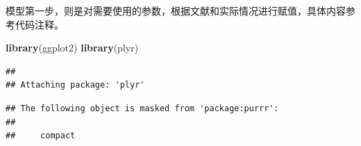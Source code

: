 \documentclass[
]{krantz}
\makeatletter
\newenvironment{Shaded}{\begin{snugshade}}{\end{snugshade}}
\newcommand{\KeywordTok}[1]{\textcolor[rgb]{0.13,0.29,0.53}{\textbf{#1}}}
\newcommand{\NormalTok}[1]{#1}
\newenvironment{kframe}{%
\medskip{}
\setlength{\fboxsep}{.8em}
 \def\at@end@of@kframe{}%
 \ifinner\ifhmode%
  \def\at@end@of@kframe{\end{minipage}}%
  \begin{minipage}{\columnwidth}%
 \fi\fi%
 \def\FrameCommand##1{\hskip\@totalleftmargin \hskip-\fboxsep
 \colorbox{shadecolor}{##1}\hskip-\fboxsep
     \hskip-\linewidth \hskip-\@totalleftmargin \hskip\columnwidth}%
 \MakeFramed {\advance\hsize-\width
   \@totalleftmargin\z@ \linewidth\hsize
   \@setminipage}}%
 {\par\unskip\endMakeFramed%
 \at@end@of@kframe}
\renewenvironment{Shaded}{\begin{kframe}}{\end{kframe}}
\makeatother
\begin{document}
模型第一步，则是对需要使用的参数，根据文献和实际情况进行赋值，具体内容参考代码注释。

\begin{Shaded}
\begin{Highlighting}[]
\KeywordTok{library}\NormalTok{(ggplot2)}
\KeywordTok{library}\NormalTok{(plyr)}
\end{Highlighting}
\end{Shaded}

\begin{verbatim}
## 
## Attaching package: 'plyr'
\end{verbatim}

\begin{verbatim}
## The following object is masked from 'package:purrr':
## 
##     compact
\end{verbatim}
\end{document}
